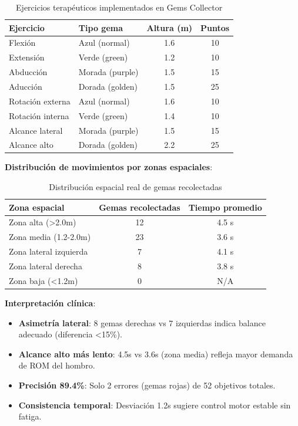 \begin{table}[h]
\centering
\begin{tabular}{|l|l|c|c|}
\hline
\textbf{Ejercicio} & \textbf{Tipo gema} & \textbf{Altura (m)} & \textbf{Puntos} \\ \hline
Flexión & Azul (normal) & 1.6 & 10 \\ \hline
Extensión & Verde (green) & 1.2 & 10 \\ \hline
Abducción & Morada (purple) & 1.5 & 15 \\ \hline
Aducción & Dorada (golden) & 1.5 & 25 \\ \hline
Rotación externa & Azul (normal) & 1.6 & 10 \\ \hline
Rotación interna & Verde (green) & 1.4 & 10 \\ \hline
Alcance lateral & Morada (purple) & 1.5 & 15 \\ \hline
Alcance alto & Dorada (golden) & 2.2 & 25 \\ \hline
\end{tabular}
\caption{Ejercicios terapéuticos implementados en Gems Collector}
\label{tab:gems-exercises}
\end{table}

\textbf{Distribución de movimientos por zonas espaciales}:

\begin{table}[h]
\centering
\begin{tabular}{|l|c|c|}
\hline
\textbf{Zona espacial} & \textbf{Gemas recolectadas} & \textbf{Tiempo promedio} \\ \hline
Zona alta (>2.0m) & 12 & 4.5 s \\ \hline
Zona media (1.2-2.0m) & 23 & 3.6 s \\ \hline
Zona lateral izquierda & 7 & 4.1 s \\ \hline
Zona lateral derecha & 8 & 3.8 s \\ \hline
Zona baja (<1.2m) & 0 & N/A \\ \hline
\end{tabular}
\caption{Distribución espacial real de gemas recolectadas}
\label{tab:gems-zones}
\end{table}

\textbf{Interpretación clínica}:

\begin{itemize}
    \item \textbf{Asimetría lateral}: 8 gemas derechas vs 7 izquierdas indica balance adecuado (diferencia <15\%).
    \item \textbf{Alcance alto más lento}: 4.5s vs 3.6s (zona media) refleja mayor demanda de ROM del hombro.
    \item \textbf{Precisión 89.4\%}: Solo 2 errores (gemas rojas) de 52 objetivos totales.
    \item \textbf{Consistencia temporal}: Desviación 1.2s sugiere control motor estable sin fatiga.
\end{itemize}

